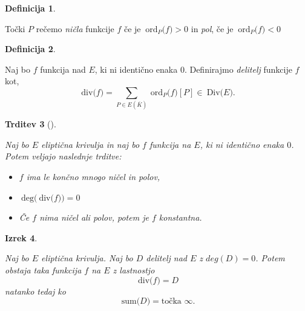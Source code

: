 \documentclass[12pt,a4paper,twoside]{article}
\theoremstyle{definition} %
\newtheorem{definicija}{Definicija}[section]
\theoremstyle{plain} %
\newtheorem{izrek}[definicija]{Izrek}
\newtheorem{trditev}[definicija]{Trditev}
\numberwithin{equation}{section}  %
\newcommand{\E}[1]{E({#1})}
\newcommand{\DIV}[1]{\ \text{Div(}{#1}\text{)}}
\newcommand{\DEG}[1]{\ \text{deg(}{#1}\text{)}}
\newcommand{\Div}[1]{\ \text{div(}{#1}\text{)}}
\newcommand{\SUM}[1]{\ \text{sum(}{#1}\text{)}}
\newcommand{\ORDp}[2]{\ \text{ord}_{#2}({#1}\text{)}}
\begin{document}
\begin{definicija}~

Točki $P$ rečemo \emph{ničla} funkcije $f$ če je $\ORDp{f}{P} > 0$ in \emph{pol}, če je $\ORDp{f}{P} < 0$
\end{definicija}

\begin{definicija}~

Naj bo $f$ funkcija nad $E$, ki ni identično enaka $0$. Definirajmo \emph{delitelj} funkcije $f$ kot,
$$\Div{f} = \sum_{P\in \E{\overline{K}}} \ORDp{f}{P}[P] \in \DIV{E}.$$
\end{definicija}


\begin{trditev}[]~

\label{trditev 11.1}
Naj bo $E$ eliptična krivulja in naj bo $f$ funkcija na $E$, ki ni identično enaka $0$. Potem veljajo naslednje trditve:
\begin{itemize}

\item $f$ ima le končno mnogo ničel in polov,
\item $\DEG{\Div{f}}=0$
\item Če $f$ nima ničel ali polov, potem je $f$ konstantna.
\end{itemize}


\end{trditev}

\begin{izrek}~

\label{izrek 11.2}
Naj bo $E$ eliptična krivulja. Naj bo $D$ delitelj nad $E$ z $deg(D) = 0$. Potem obstaja taka funkcija $f$ na $E$ z lastnostjo
$$\Div{f} = D$$
natanko tedaj ko
$$\SUM{D} = \text{točka }\infty.$$

\end{izrek}
\end{document}
